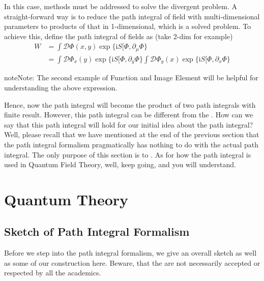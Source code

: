 \documentclass[letterpaper,10pt,english]{sphinxmanual}
\begin{document}
In this case, methods must be addressed to solve the divergent problem. A straight-forward way is to reduce the path integral of field with multi-dimensional parameters to products of that in 1-dimensional, which is a solved problem. To achieve this, define the path integral of fields as (take 2-dim for example)
\begin{equation*}
\begin{split}W &= \int \mathcal{D}\Phi(x,y)\exp\{\mathrm{i}S[\Phi, \partial_\mu\Phi\} \\
&= \int \mathcal{D}\Phi_x(y)\exp\{\mathrm{i}S[\Phi, \partial_y\Phi\}\int \mathcal{D}\Phi_y(x)\exp\{\mathrm{i}S[\Phi, \partial_x\Phi\}\end{split}
\end{equation*}
\begin{sphinxadmonition}{note}{Note:}
The second example of Function and Image Element will be helpful for understanding the above expression.
\end{sphinxadmonition}

Hence, now the path integral will become the product of two path integrals with finite result. However, this path integral can be different from the . How can we say that this  path integral will hold for our initial idea about the path integral? Well, please recall that we have mentioned at the end of the previous section that the path integral formalism pragmatically has nothing to do with the actual path integral. The only purpose of this section is to . As for how the path integral is used in Quantum Field Theory, well, keep going, and you will understand.


\chapter{Quantum Theory}
\label{\detokenize{quanfield::doc}}\label{\detokenize{quanfield:quantum-theory}}

\section{Sketch of Path Integral Formalism}
\label{\detokenize{qft_sketch:sketch-of-path-integral-formalism}}\label{\detokenize{qft_sketch::doc}}
Before we step into the path integral formalism, we give an overall sketch as well as some  of our construction here. Beware, that the  are not necessarily accepted or respected by all the academics.
\end{document}
